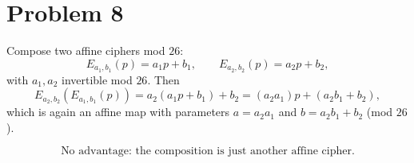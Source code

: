 \section*{Problem 8}

Compose two affine ciphers mod \(26\):
\[
E_{a_1,b_1}(p)=a_1p+b_1,\qquad E_{a_2,b_2}(p)=a_2p+b_2,
\]
with \(a_1,a_2\) invertible mod \(26\).
Then
\[
E_{a_2,b_2}(E_{a_1,b_1}(p))
= a_2(a_1p+b_1)+b_2
= (a_2a_1)p+(a_2b_1+b_2),
\]
which is again an affine map with parameters \(a=a_2a_1\) and \(b=a_2b_1+b_2\) (mod \(26\)).

\[
\boxed{\text{No advantage: the composition is just another affine cipher.}}
\]
